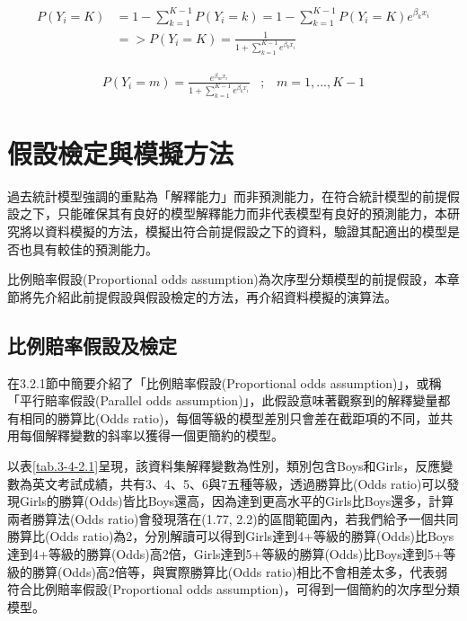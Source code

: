 \begin{equation}
\label{eq.3-2-5.4}
\begin{aligned}
P(Y_i=K)& = 1-\sum_{k=1}^{K-1}P(Y_i=k) = 1-\sum_{k=1}^{K-1}P(Y_i=K)e^{\beta_kx_i}\\&
=>P(Y_i=K) = \frac{1}{1+\sum_{k=1}^{K-1}e^{\beta_kx_i}}
\end{aligned}
\end{equation}


\begin{equation}
\label{eq.3-2-5.5}
\begin{aligned}
P(Y_i=m) = \frac{e^{\beta_{m}x_i}}{1+\sum_{k=1}^{K-1}e^{\beta_{k}x_i}}\;\;\;;\;\;\;m = 1,..., K-1 
\end{aligned}
\end{equation}



\section{假設檢定與模擬方法}

	過去統計模型強調的重點為「解釋能力」而非預測能力，在符合統計模型的前提假設之下，只能確保其有良好的模型解釋能力而非代表模型有良好的預測能力，本研究將以資料模擬的方法，模擬出符合前提假設之下的資料，驗證其配適出的模型是否也具有較佳的預測能力。	
	
	比例賠率假設(Proportional odds assumption)為次序型分類模型的前提假設，本章節將先介紹此前提假設與假設檢定的方法，再介紹資料模擬的演算法。
	

\subsection{比例賠率假設及檢定}

	在3.2.1節中簡要介紹了「比例賠率假設(Proportional odds assumption)」，或稱「平行賠率假設(Parallel odds assumption)」，此假設意味著觀察到的解釋變量都有相同的勝算比(Odds ratio)，每個等級的模型差別只會差在截距項的不同，並共用每個解釋變數的斜率以獲得一個更簡約的模型。
	
	以表\ref{tab.3-4-2.1}呈現，該資料集解釋變數為性別，類別包含Boys和Girls，反應變數為英文考試成績，共有3、4、5、6與7五種等級，透過勝算比(Odds ratio)可以發現Girls的勝算(Odds)皆比Boys還高，因為達到更高水平的Girls比Boys還多，計算兩者勝算法(Odds ratio)會發現落在(1.77, 2.2)的區間範圍內，若我們給予一個共同勝算比(Odds ratio)為2，分別解讀可以得到Girls達到4+等級的勝算(Odds)比Boys達到4+等級的勝算(Odds)高2倍，Girls達到5+等級的勝算(Odds)比Boys達到5+等級的勝算(Odds)高2倍等，與實際勝算比(Odds ratio)相比不會相差太多，代表弱符合比例賠率假設(Proportional odds assumption)，可得到一個簡約的次序型分類模型。
	
